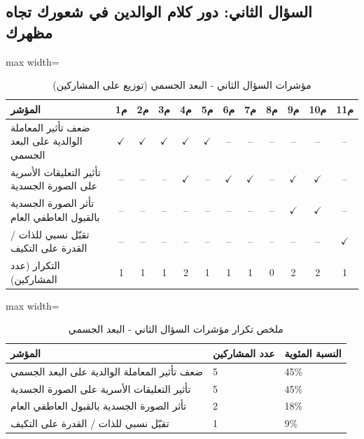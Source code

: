 \documentclass[12pt,oneside]{report}
\begin{document}
\subsection{السؤال الثاني: دور كلام الوالدين في شعورك تجاه مظهرك}
\begin{table}[H]
\centering
\caption{مؤشرات السؤال الثاني - البعد الجسمي (توزيع على المشاركين)}
\scriptsize
\renewcommand{\arraystretch}{1.3}
\setlength{\tabcolsep}{4pt}
\begin{adjustbox}{max width=\textwidth}
\begin{tabular}{l c c c c c c c c c c c}
\toprule
\textbf{المؤشر} & \textbf{م1} & \textbf{م2} & \textbf{م3} & \textbf{م4} & \textbf{م5} & \textbf{م6} & \textbf{م7} & \textbf{م8} & \textbf{م9} & \textbf{م10} & \textbf{م11} \\
\midrule
ضعف تأثير المعاملة الوالدية على البعد الجسمي & $\checkmark$ & $\checkmark$ & $\checkmark$ & $\checkmark$ & $\checkmark$ & -- & -- & -- & -- & -- & -- \\
تأثير التعليقات الأسرية على الصورة الجسدية & -- & -- & -- & $\checkmark$ & -- & $\checkmark$ & $\checkmark$ & -- & $\checkmark$ & $\checkmark$ & -- \\
تأثر الصورة الجسدية بالقبول العاطفي العام & -- & -- & -- & -- & -- & -- & -- & -- & $\checkmark$ & $\checkmark$ & -- \\
تقبّل نسبي للذات / القدرة على التكيف & -- & -- & -- & -- & -- & -- & -- & -- & -- & -- & $\checkmark$ \\
التكرار (عدد المشاركين) & 1 & 1 & 1 & 2 & 1 & 1 & 1 & 0 & 2 & 2 & 1 \\
\bottomrule
\end{tabular}
\end{adjustbox}
\end{table}
\begin{table}[H]
\centering
\caption{ملخص تكرار مؤشرات السؤال الثاني - البعد الجسمي}
\small
\renewcommand{\arraystretch}{1.3}
\setlength{\tabcolsep}{4pt}
\begin{adjustbox}{max width=\textwidth}
\begin{tabular}{p{6cm} p{4cm} p{4cm}}
\toprule
\textbf{المؤشر} & \textbf{عدد المشاركين} & \textbf{النسبة المئوية} \\
\midrule
ضعف تأثير المعاملة الوالدية على البعد الجسمي & 5 & 45\% \\
تأثير التعليقات الأسرية على الصورة الجسدية & 5 & 45\% \\
تأثر الصورة الجسدية بالقبول العاطفي العام & 2 & 18\% \\
تقبّل نسبي للذات / القدرة على التكيف & 1 & 9\% \\
\bottomrule
\end{tabular}
\end{adjustbox}
\end{table}
\end{document}
